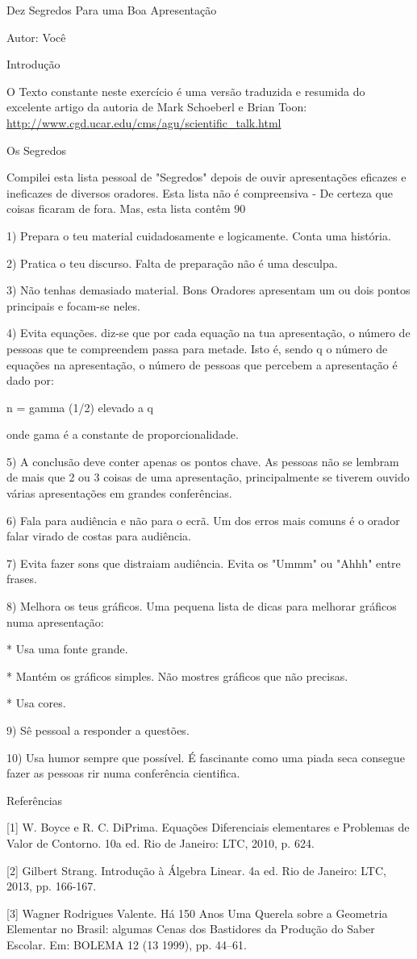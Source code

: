 \documentclass[12pt]{article}
\begin{document}
Dez Segredos Para uma Boa Apresentação

Autor: Você

Introdução

O Texto constante neste exercício é uma versão traduzida e resumida do excelente artigo da autoria de Mark Schoeberl e Brian Toon:
\url{http://www.cgd.ucar.edu/cms/agu/scientific_talk.html}

Os Segredos

Compilei esta lista pessoal de "Segredos" depois de ouvir apresentações eficazes e ineficazes de diversos oradores. Esta lista não é compreensiva - De certeza que coisas ficaram de fora. Mas, esta lista contêm 90%

1) Prepara o teu material cuidadosamente e logicamente. Conta uma história.

2) Pratica o teu discurso. Falta de preparação não é uma desculpa.

3) Não tenhas demasiado material. Bons Oradores apresentam um ou dois pontos principais e focam-se neles.

4) Evita equações. diz-se que por cada equação na tua apresentação, o número de pessoas que te compreendem passa para metade. Isto é, sendo q o número de equações na apresentação, o número de pessoas que percebem a apresentação é dado por:

n = gamma (1/2) elevado a q

onde gama é a constante de proporcionalidade.

5) A conclusão deve conter apenas os pontos chave. As pessoas não se lembram de mais que 2 ou 3 coisas de uma apresentação, principalmente se tiverem ouvido várias apresentações em grandes conferências.

6) Fala para audiência e não para o ecrã. Um dos erros mais comuns é o orador falar virado de costas para audiência. 

7) Evita fazer sons que distraiam audiência. Evita os "Ummm" ou "Ahhh" entre frases.

8) Melhora os teus gráficos. Uma pequena lista de dicas para melhorar gráficos numa apresentação:

* Usa uma fonte grande.

* Mantém os gráficos simples. Não mostres gráficos que não precisas.

* Usa cores.

9) Sê pessoal a responder a questões.

10) Usa humor sempre que possível. É fascinante como uma piada seca consegue fazer as pessoas rir numa conferência cientifica.



Referências 


[1] W. Boyce e R. C. DiPrima. Equações Diferenciais elementares e Problemas de Valor de Contorno. 10a ed. Rio de Janeiro: LTC, 2010, p. 624.

[2] Gilbert Strang. Introdução à Álgebra Linear. 4a ed. Rio de Janeiro: LTC, 2013, pp. 166-167.

[3] Wagner Rodrigues Valente. Há 150 Anos Uma Querela sobre a Geometria Elementar no Brasil: algumas Cenas dos Bastidores da Produção do Saber Escolar. Em: BOLEMA 12 (13 1999), pp. 44–61.
\end{document}
